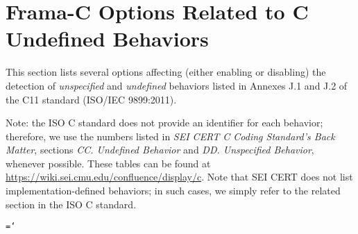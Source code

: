 \section{Frama-C Options Related to C Undefined Behaviors}

This section lists several \FramaC options affecting (either enabling or
disabling) the detection of {\em unspecified} and {\em undefined} behaviors
listed in Annexes J.1 and J.2 of the C11 standard (ISO/IEC 9899:2011).

Note: the ISO C standard does not provide an identifier for each behavior;
therefore, we use the numbers listed in
{\em SEI CERT C Coding Standard's Back Matter}, sections
{\em CC. Undefined Behavior} and {\em DD. Unspecified Behavior}, whenever
possible. These tables can be found at
\url{https://wiki.sei.cmu.edu/confluence/display/c}.
Note that SEI CERT does not list implementation-defined behaviors; in such
cases, we simply refer to the related section in the ISO C standard.

\texttt{\hyphenchar\font=`\-  }

